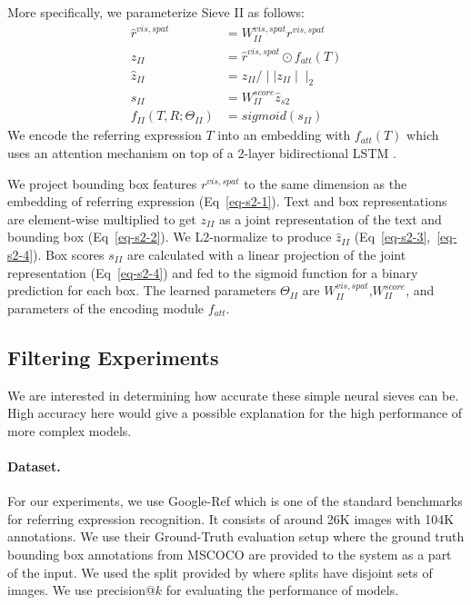 \documentclass[11pt,a4paper]{article}
\begin{document}
More specifically, we parameterize Sieve II as follows:
\vspace{-10pt}
\begin{align}
	\hat{r}^{vis,spat} & = W^{vis,spat}_{II} r^{vis,spat} \label{eq-s2-1} \\ 
	z_{II} & = \hat{r}^{vis,spat} \odot f_{att}(T) \label{eq-s2-2} \\
    \hat{z}_{II} & =  z_{II} / \mid\mid z_{II} \mid\mid_{2} \label{eq-s2-3} \\ 
    s_{II} & =  W_{II}^{score} \hat{z}_{s2}  \label{eq-s2-4} \\
    f_{II}(T,R; \Theta_{II}) & =  sigmoid(s_{II}) \label{eq-s2-5}
\end{align}
We encode the referring expression $T$  into an embedding with $f_{att}(T)$ which uses an attention mechanism \cite{bahdanau2014neural} on top of a 2-layer bidirectional LSTM \citep{schuster1997bidirectional}.

We project bounding box features $r^{vis,spat}$ to the same dimension as the embedding of referring expression (Eq~\ref{eq-s2-1}).
Text and box representations are element-wise multiplied to get $z_{II}$ as a joint representation of the text and bounding box (Eq~\ref{eq-s2-2}).
We L2-normalize to produce $\hat{z}_{II}$ (Eq~\ref{eq-s2-3},~\ref{eq-s2-4}).
Box scores $s_{II}$ are calculated with a linear projection of the joint representation (Eq~\ref{eq-s2-4}) and fed to the sigmoid function for a binary prediction for each box.
The learned parameters $\Theta_{II}$ are $W_{II}^{vis,spat}$,$W_{II}^{score}$, and parameters of the encoding module $f_{att}$.
\vspace{-5pt}
\subsection{Filtering Experiments}\label{sec:experiments}
\vspace{-5pt}
We are interested in determining how accurate these simple neural sieves can be. High accuracy here would give a possible explanation for the high performance of more complex models.
\tableeight
\paragraph{Dataset.} For our experiments, we use Google-Ref \citep{mao2016generation} which is one of the standard benchmarks for referring expression recognition. It consists of around 26K images with 104K annotations.
We use their Ground-Truth evaluation setup where the ground truth bounding box annotations from MSCOCO \citep{lin2014microsoft} are provided to the system as a part of the input.
We used the split provided by \citet{nagaraja16refexp} where splits have disjoint sets of images.
We use precision@$k$ for evaluating the performance of models.
\end{document}
